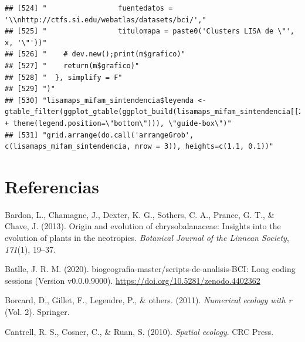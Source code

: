 \documentclass[11pt,]{article}
\begin{document}
\begin{verbatim}
## [524] "                 fuentedatos = '\\nhttp://ctfs.si.edu/webatlas/datasets/bci/',"                                                                                        
## [525] "                 titulomapa = paste0('Clusters LISA de \"', x, '\"'))"                                                                                                 
## [526] "    # dev.new();print(m$grafico)"                                                                                                                                      
## [527] "    return(m$grafico)"                                                                                                                                                 
## [528] "  }, simplify = F"                                                                                                                                                     
## [529] ")"                                                                                                                                                                     
## [530] "lisamaps_mifam_sintendencia$leyenda <- gtable_filter(ggplot_gtable(ggplot_build(lisamaps_mifam_sintendencia[[2]] + theme(legend.position=\"bottom\"))), \"guide-box\")"
## [531] "grid.arrange(do.call('arrangeGrob', c(lisamaps_mifam_sintendencia, nrow = 3)), heights=c(1.1, 0.1))"
\end{verbatim}

\section*{Referencias}\label{referencias}

\hypertarget{refs}{}
\hypertarget{ref-bardon2013origin}{}
Bardon, L., Chamagne, J., Dexter, K. G., Sothers, C. A., Prance, G. T.,
\& Chave, J. (2013). Origin and evolution of chrysobalanaceae: Insights
into the evolution of plants in the neotropics. \emph{Botanical Journal
of the Linnean Society}, \emph{171}(1), 19--37.

\hypertarget{ref-jose_ramon_martinez_batlle_2020_4402362}{}
Batlle, J. R. M. (2020). biogeografia-master/scripts-de-analisis-BCI:
Long coding sessions (Version v0.0.0.9000).
\url{https://doi.org/10.5281/zenodo.4402362}

\hypertarget{ref-borcard2011numerical}{}
Borcard, D., Gillet, F., Legendre, P., \& others. (2011).
\emph{Numerical ecology with r} (Vol. 2). Springer.

\hypertarget{ref-cantrell2010spatial}{}
Cantrell, R. S., Cosner, C., \& Ruan, S. (2010). \emph{Spatial ecology}.
CRC Press.
\end{document}

